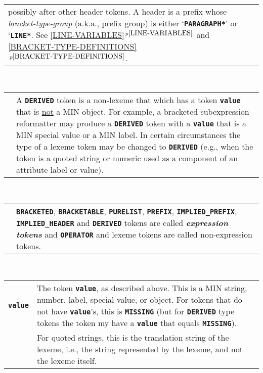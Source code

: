 \documentclass[12pt]{article}
\makeatletter
\newcommand{\TT}[1]{{\tt \bfseries #1}}
\newcommand{\skey}[2]{{\bf \em #1#2}\index{#1}}
\newcommand{\ttmkey}[2]{\TT{#1}\index{#1@\TT{#1}!#2}}
\newcommand{\itemref}[1]{\ref{#1}$\,^{p\pageref{#1}}$}
\newcommand{\EOL}{\penalty \exhyphenpenalty}
\newenvironment{indpar}[1][0.3in]%
	{\begin{list}{}%
		     {\setlength{\itemsep}{0in}%
		      \setlength{\topsep}{0in}%
		      \setlength{\parsep}{1ex}%
		      \setlength{\labelwidth}{#1}%
		      \setlength{\leftmargin}{#1}%
		      \addtolength{\leftmargin}{\labelsep}}%
	 \item}%
	{\end{list}}
\makeatother
\begin{document}
\begin{indpar}
\begin{tabular}{p{1in}p{4.5in}}
		  possibly after other header tokens.  A header
		  is a prefix whose {\em bracket-\EOL type-\EOL group}
		  (a.k.a., prefix group) is
		  either `\TT{*PARAGRAPH*}' or `\TT{*LINE*}.
                  See \itemref{LINE-VARIABLES} and
		  \itemref{BRACKET-TYPE-DEFINITIONS}.
\end{tabular}
\\[1ex]
\begin{tabular}{p{1in}p{4.5in}}
		& A \TT{DERIVED} token is a non-lexeme that which has
		  a token \TT{value} that is \underline{not} a MIN object.
		  For example, a bracketed
		  subexpression reformatter may
		  produce a \TT{DERIVED} token with a \TT{value} that is
		  a MIN special value or a MIN label.  In certain circumstances
		  the type of a lexeme token may be changed to
		  \TT{DERIVED} (e.g., when the token is a quoted string
		  or numeric used as a
		  component of an attribute label or value).
\end{tabular}
\\[1ex]  
\begin{tabular}{p{1in}p{4.5in}}
		& \TT{BRACKETED}, \TT{BRACKETABLE}, \TT{PURELIST}, \TT{PREFIX},
		  \TT{IMPLIED\_\EOL PREFIX}, \TT{IMPLIED\_\EOL HEADER}
		  and \TT{DERIVED}
		  tokens are called
		  \skey{expression token}s and \TT{OPERATOR} and lexeme
		  tokens are called non-expression tokens.
\end{tabular}
\\[1ex]
\begin{tabular}{p{1in}p{4.5in}}
\ttmkey{value}{of token}
		& The token \TT{value}, as described above.  This is
		  a MIN string, number, label, special value, or object.
		  For tokens that do not have \TT{value}'s, this is \TT{MISSING}
		  (but for \TT{DERIVED} type tokens the token my have
		  a \TT{value} that equals \TT{MISSING}).
\\[1ex]
		& For quoted strings,
                  this is the translation string of the lexeme,
		  i.e., the string represented by the lexeme,
		  and not the lexeme itself.


\end{tabular}
\end{indpar}
\end{document}
